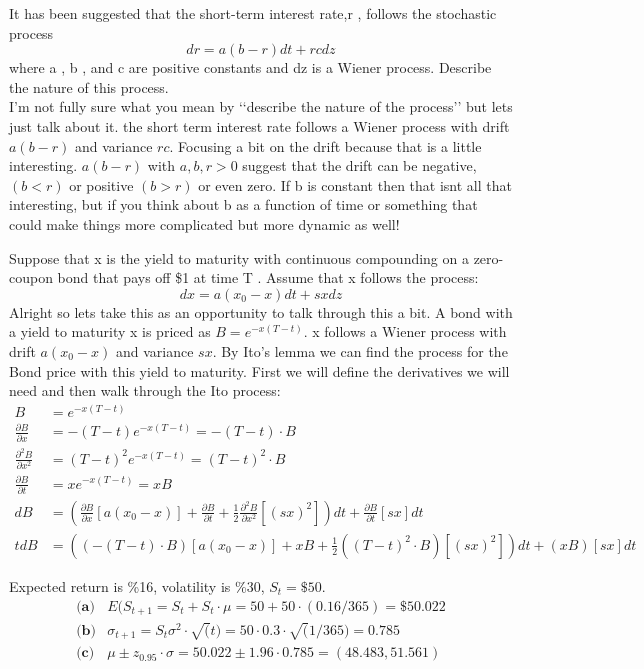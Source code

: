\documentclass[12pt]{article}
\newenvironment{problem}[3][Problem]{\begin{trivlist}
\item[\hskip \labelsep {\bfseries #1}\hskip \labelsep {\bfseries #2.}]}{\end{trivlist}}
\begin{document}
\begin{problem}{14.9}. It has been suggested that the short-term interest rate,r , follows the stochastic process
$$ dr = a(b-r)dt + rc dz $$
where a , b , and c are positive constants and dz is a Wiener process. Describe the nature
of this process. \\
I\rq{}m not fully sure what you mean by \lq\lq{}describe the nature of the process\rq\rq{} but lets just talk about it. 
the short term interest rate follows a Wiener process with drift $a(b-r)$ and variance $rc$. Focusing a bit on the drift because that is a little interesting. $a(b-r)$ with $a,b,r>0$ suggest that the drift can be negative, $(b<r)$ or positive $(b>r)$ or even zero. If b is constant then that isnt all that interesting, but if you think about b as a function of time or something that could make things more complicated but more dynamic as well!
\end{problem}

\newpage 
\begin{problem}{14.11}. Suppose that x is the yield to maturity with continuous compounding on a zero-coupon bond
that pays off \$1 at time T . Assume that x follows the process: $$ dx = a(x_0 - x)dt + sxdz$$ 
Alright so lets take this as an opportunity to talk through this a bit. A bond with a yield to maturity x is priced as $B=e^{-x(T-t)}$. x follows a Wiener process with drift $a(x_0 - x)$ and variance $sx$. By Ito\rq{}s lemma we can find the process for the Bond price with this yield to maturity. First we will define the derivatives we will need and then walk through the Ito process:
\begin{align*}
B &= e^{-x(T-t)} \\
\frac{\partial B}{\partial x} &= -(T-t)e^{-x(T-t)}  = -(T-t)\cdot B \\
\frac{\partial^2 B}{\partial x^2} &= (T-t)^2e^{-x(T-t)} = (T-t)^2\cdot B \\
\frac{\partial B}{\partial t} &= x e^{-x(T-t)} = xB \\
dB &= (\frac{\partial B}{\partial x} [a(x_0-x)] + \frac{\partial B}{\partial t} + \frac{1}{2} \frac{\partial^2 B}{\partial x^2}[(sx)^2])dt + \frac{\partial B}{\partial t}[sx]dt \\t
dB &= ((-(T-t)\cdot B) [a(x_0-x)] + xB+ \frac{1}{2} ( (T-t)^2\cdot B)[(sx)^2])dt +(xB)[sx]dt 
\end{align*}
\end{problem}

\begin{problem}{14.13}. Expected return is \%16, volatility is \%30, $S_t = \$50$. 
\begin{align*}
\textbf{(a)} & E(S_{t+1} = S_t + S_t\cdot \mu = 50 + 50\cdot (0.16/365) = \$ 50.022 \\
\textbf{(b)} & \sigma_{t+1} = S_t \sigma^2 \cdot \sqrt(t) = 50\cdot 0.3 \cdot \sqrt (1/365) = 0.785 \\
\textbf{(c)} & \mu \pm z_{0.95}\cdot \sigma = 50.022 \pm 1.96\cdot 0.785 = (48.483,51.561)
\end{align*}
\end{problem}
\end{document}
